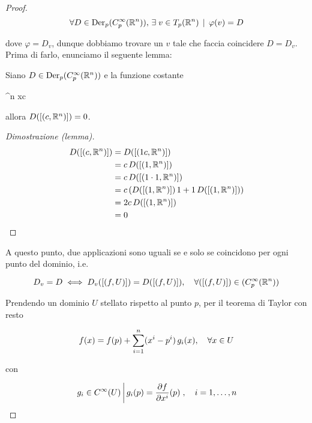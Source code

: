 \begin{proof}
	\begin{equation}
		\forall D \in \operatorname{Der}_{p} (C_{p}^{\infty}(\mathbb{R}^{n})), \, \exists \; v \in T_{p}(\mathbb{R}^{n}) \, \mid \, \varphi(v) = D
	\end{equation}
	
	dove $ \varphi = D_{v} $, dunque dobbiamo trovare un $ v $ tale che faccia coincidere $ D = D_{v} $. \\
	Prima di farlo, enunciamo il seguente lemma:

	\begin{lemma}
		Siano $ D \in \operatorname{Der}_{p} (C_{p}^{\infty}(\mathbb{R}^{n})) $ e la funzione costante
		
			{\R^{n}}{\R}
			{x}{c}
	
		allora $ D([(c,\mathbb{R}^{n})]) = 0 $.
	\end{lemma}

	\begin{proof}[Dimostrazione (lemma)]
		\begin{align}
			\begin{split}
				D([(c,\mathbb{R}^{n})]) &= D([(1 c,\mathbb{R}^{n})]) \\
				&= c \, D([(1,\mathbb{R}^{n})]) \\
				&= c \, D([(1 \cdot 1,\mathbb{R}^{n})]) \\
				&= c \, ( D([(1,\mathbb{R}^{n})]) \, 1 + 1 \, D([(1,\mathbb{R}^{n})]) ) \\
				&= 2 c \, D([(1,\mathbb{R}^{n})]) \\
				&= 0
			\end{split}
		\end{align}
	\end{proof}

	A questo punto, due applicazioni sono uguali se e solo se coincidono per ogni punto del dominio, i.e.
	
	\begin{equation}
		D_{v} = D \iff D_{v}([(f,U)]) = D([(f,U)]), \quad \forall ([(f,U)]) \in (C_{p}^{\infty}(\mathbb{R}^{n}))
	\end{equation}

	Prendendo un dominio $ U $ stellato rispetto al punto $ p $, per il teorema di Taylor con resto
	
	\begin{equation}
		f(x) = f(p) + \sum_{i=1}^{n} (x^{i}-p^{i}) \, g_{i}(x) \qcomma \forall x \in U
	\end{equation}

	con
	
	\begin{equation}
		\left. g_{i} \in C^{\infty}(U) \, \middle| \, g_{i}(p) = \dfrac{\partial f}{\partial x^{i}} (p) \right., \quad i=1,\dots,n
	\end{equation}


\end{proof}
